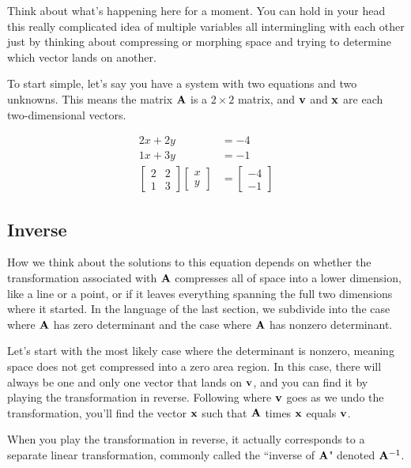 Think about what's happening here for a moment. You can hold in your head this
really complicated idea of multiple variables all intermingling with each other
just by thinking about compressing or morphing space and trying to determine
which vector lands on another.

To start simple, let's say you have a system with two equations and two
unknowns. This means the matrix $\mathbf{A}$ is a $2 \times 2$ matrix, and
$\mathbf{v}$ and $\mathbf{x}$ are each two-dimensional vectors.

\begin{align*}
  2x + 2y &= -4 \\
  1x + 3y &= -1 \\
  \begin{bmatrix}
    2 & 2 \\
    1 & 3
  \end{bmatrix}
  \begin{bmatrix}
    x \\
    y
  \end{bmatrix} &=
  \begin{bmatrix}
    -4 \\
    -1
  \end{bmatrix}
\end{align*}

\subsection{Inverse}

How we think about the solutions to this equation depends on whether the
transformation associated with $\mathbf{A}$ compresses all of space into a lower
dimension, like a line or a point, or if it leaves everything spanning the full
two dimensions where it started. In the language of the last section, we
subdivide into the case where $\mathbf{A}$ has zero determinant and the case where
$\mathbf{A}$ has nonzero determinant.

Let's start with the most likely case where the determinant is nonzero, meaning
space does not get compressed into a zero area region. In this case, there will
always be one and only one vector that lands on $\mathbf{v}$, and you can find it
by playing the transformation in reverse. Following where $\mathbf{v}$ goes as we
undo the transformation, you'll find the vector $\mathbf{x}$ such that $\mathbf{A}$
times $\mathbf{x}$ equals $\mathbf{v}$.

When you play the transformation in reverse, it actually corresponds to a
separate linear transformation, commonly called the ``inverse of $\mathbf{A}$"
denoted $\mathbf{A}^{-1}$.

